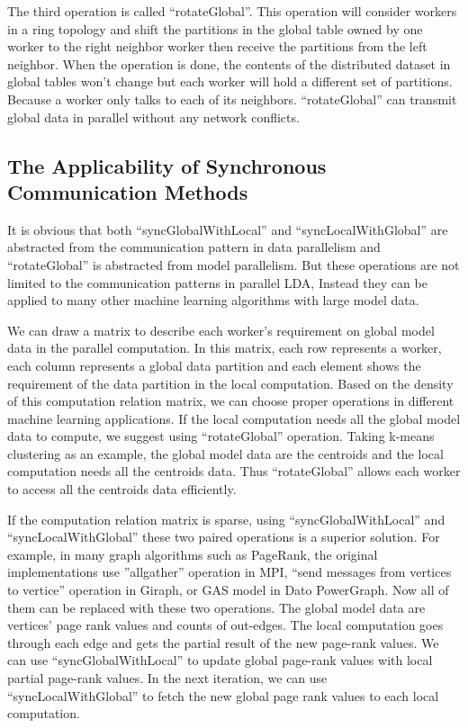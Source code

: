 \documentclass[conference]{IEEEtran}
\begin{document}
The third operation is called ``rotateGlobal''.
This operation will consider workers in a ring topology and 
shift the partitions in the global table
owned by one worker to the right neighbor worker
then receive the partitions from the left neighbor.
When the operation is done,
the contents of the distributed dataset in global tables won't change 
but each worker will hold a different set of partitions. 
Because a worker only talks to each of its neighbors. 
``rotateGlobal'' can transmit global data in parallel
without any network conflicts. 
\subsection{The Applicability of Synchronous Communication Methods}
It is obvious that both ``syncGlobalWithLocal'' and ``syncLocalWithGlobal''
are abstracted from the communication pattern in data parallelism
and ``rotateGlobal'' is abstracted from model parallelism.
But these operations are not limited to the communication patterns in parallel LDA,
Instead they can be applied to many other machine learning algorithms
with large model data.

We can draw a matrix to describe
each worker's requirement on global model data
in the parallel computation.
In this matrix, each row represents a worker,
each column represents a global data partition
and each element shows the requirement of
the data partition in the local computation.
Based on the density of this computation relation matrix,
we can choose proper operations in different machine learning applications.
If the local computation needs all the global model data to compute,
we suggest using ``rotateGlobal'' operation. 
Taking k-means clustering as an example, the global model data are the centroids 
and the local computation needs all the centroids data.
Thus ``rotateGlobal'' allows each worker
to access all the centroids data efficiently.

If the computation relation matrix is sparse,
using ``syncGlobalWithLocal'' and ``syncLocalWithGlobal''
these two paired operations is a superior solution.
For example, in many graph algorithms such as PageRank,
the original implementations use ''allgather'' operation in MPI, 
``send messages from vertices to vertice'' operation in Giraph,
or GAS model in Dato PowerGraph.
Now all of them can be replaced with these two operations. 
The global model data are vertices' page rank values and counts of out-edges.
The local computation goes through each edge
and gets the partial result of the new page-rank values.
We can use ``syncGlobalWithLocal'' to update global page-rank values
with local partial page-rank values. 
In the next iteration, we can use ``syncLocalWithGlobal''
to fetch the new global page rank values to each local computation.
\end{document}
